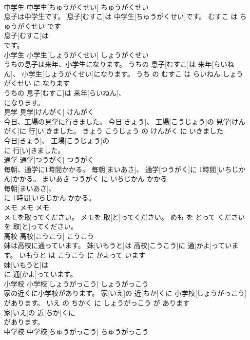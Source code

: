 \documentclass[8pt]{extreport}
\begin{document}
\begin{CJK}{UTF8}{min}
\\	中学生	中学生[ちゅうがくせい]	ちゅうがくせい	
\\	息子は中学生です。	息子[むすこ]は 中学生[ちゅうがくせい]です。	むすこ は ちゅうがくせい です	
\\	息子[むすこ]は
\\	です。		
\\	小学生	小学生[しょうがくせい]	しょうがくせい	
\\	うちの息子は来年、小学生になります。	うちの 息子[むすこ]は 来年[らいねん]、 小学生[しょうがくせい]になります。	うち の むすこ は らいねん しょうがくせい に なります	
\\	うちの 息子[むすこ]は 来年[らいねん]、
\\	になります。		
\\	見学	見学[けんがく]	けんがく	
\\	今日、工場の見学に行きました。	今日[きょう]、 工場[こうじょう]の 見学[けんがく]に 行[い]きました。	きょう こうじょう の けんがく に いきました	
\\	今日[きょう]、 工場[こうじょう]の
\\	に 行[い]きました。		
\\	通学	通学[つうがく]	つうがく	
\\	毎朝、通学に1時間かかる。	毎朝[まいあさ]、 通学[つうがく]に 1時間[いちじかん]かかる。	まいあさ つうがく に いちじかん かかる	
\\	毎朝[まいあさ]、
\\	に 1時間[いちじかん]かかる。		
\\	メモ	メモ	メモ	
\\	メモを取ってください。	メモを 取[と]ってください。	めも を とって ください	
\\	を 取[と]ってください。		
\\	高校	高校[こうこう]	こうこう	
\\	妹は高校に通っています。	妹[いもうと]は 高校[こうこう]に 通[かよ]っています。	いもうと は こうこう に かよって います	
\\	妹[いもうと]は
\\	に 通[かよ]っています。		
\\	小学校	小学校[しょうがっこう]	しょうがっこう	
\\	家の近くに小学校があります。	家[いえ]の 近[ちか]くに 小学校[しょうがっこう]があります。	いえ の ちかく に しょうがっこう が あります	
\\	家[いえ]の 近[ちか]くに
\\	があります。		
\\	中学校	中学校[ちゅうがっこう]	ちゅうがっこう	

\end{CJK}
\end{document}
